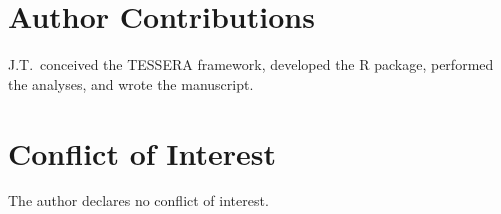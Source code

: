 \documentclass[12pt]{article}
\begin{document}
\section*{Author Contributions}

J.T.\ conceived the TESSERA framework, developed the R package, performed the analyses, and wrote the manuscript.


\section*{Conflict of Interest}

The author declares no conflict of interest.


\newpage

% 
\end{document}
